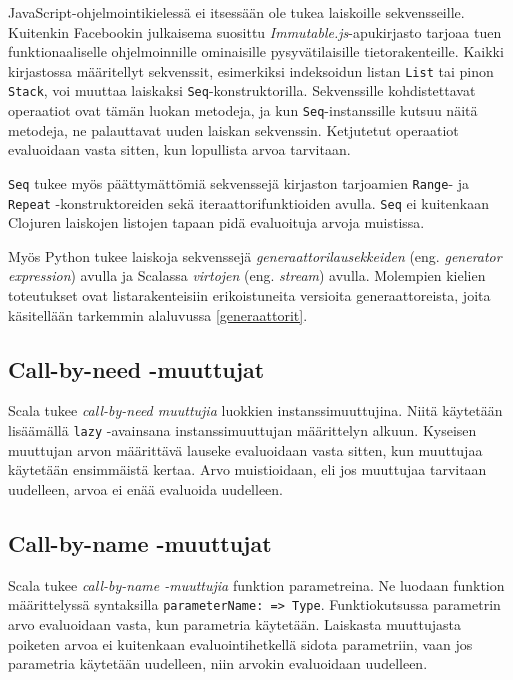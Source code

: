 JavaScript-ohjelmointikielessä ei itsessään ole tukea laiskoille sekvensseille. Kuitenkin Facebookin julkaisema suosittu \textit{Immutable.js}-apukirjasto tarjoaa tuen funktionaaliselle ohjelmoinnille ominaisille pysyvätilaisille tietorakenteille. Kaikki kirjastossa määritellyt sekvenssit, esimerkiksi indeksoidun listan \verb!List! tai pinon \verb!Stack!, voi muuttaa laiskaksi \verb!Seq!-konstruktorilla. Sekvenssille kohdistettavat operaatiot ovat tämän luokan metodeja, ja kun \verb!Seq!-instanssille kutsuu näitä metodeja, ne palauttavat uuden laiskan sekvenssin. Ketjutetut operaatiot evaluoidaan vasta sitten, kun lopullista arvoa tarvitaan.

\begin{sloppypar}
\verb!Seq! tukee myös päättymättömiä sekvenssejä kirjaston tarjoamien \verb!Range!- ja \verb!Repeat! \mbox{-konstruktoreiden} sekä iteraattorifunktioiden avulla. \verb!Seq! ei kuitenkaan Clojuren laiskojen listojen tapaan pidä evaluoituja arvoja muistissa.
\end{sloppypar}

Myös Python tukee laiskoja sekvenssejä \textit{generaattorilausekkeiden} (eng. \textit{generator expression}) avulla ja Scalassa \textit{virtojen} (eng. \textit{stream}) avulla. Molempien kielien toteutukset ovat listarakenteisiin erikoistuneita versioita generaattoreista, joita käsitellään tarkemmin alaluvussa \ref{generaattorit}.

\subsection{Call-by-need -muuttujat}

Scala tukee \textit{call-by-need muuttujia} luokkien instanssimuuttujina. Niitä käytetään lisäämällä \verb!lazy! -avainsana instanssimuuttujan määrittelyn alkuun. Kyseisen muuttujan arvon määrittävä lauseke evaluoidaan vasta sitten, kun muuttujaa käytetään ensimmäistä kertaa. Arvo muistioidaan, eli jos muuttujaa tarvitaan uudelleen, arvoa ei enää evaluoida uudelleen.

\subsection{Call-by-name -muuttujat}

Scala tukee \textit{call-by-name -muuttujia} funktion parametreina. Ne luodaan funktion määrittelyssä syntaksilla \verb!parameterName: => Type!. Funktiokutsussa parametrin arvo evaluoidaan vasta, kun parametria käytetään. Laiskasta muuttujasta poiketen arvoa ei kuitenkaan evaluointihetkellä sidota parametriin, vaan jos parametria käytetään uudelleen, niin arvokin evaluoidaan uudelleen.

